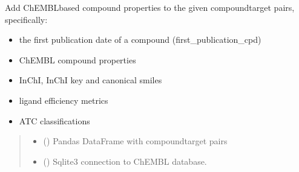 \documentclass[letterpaper,10pt,english]{sphinxmanual}
\begin{document}
\begin{fulllineitems}
\label{\detokenize{add_chembl_compound_properties:add_chembl_compound_properties.add_all_chembl_compound_properties}}
\pysigstartsignatures
{}
\pysigstopsignatures
\sphinxAtStartPar
Add ChEMBL\sphinxhyphen{}based compound properties to the given compound\sphinxhyphen{}target pairs, specifically:
\begin{itemize}
\item {} 
\sphinxAtStartPar
the first publication date of a compound (first\_publication\_cpd)

\item {} 
\sphinxAtStartPar
ChEMBL compound properties

\item {} 
\sphinxAtStartPar
InChI, InChI key and canonical smiles

\item {} 
\sphinxAtStartPar
ligand efficiency metrics

\item {} 
\sphinxAtStartPar
ATC classifications

\end{itemize}
\begin{quote}\begin{description}
\begin{itemize}
\item {} 
\sphinxAtStartPar
{} () \textendash{} Pandas DataFrame with compound\sphinxhyphen{}target pairs

\item {} 
\sphinxAtStartPar
{} () \textendash{} Sqlite3 connection to ChEMBL database.


\end{itemize}
\end{description}
\end{quote}
\end{fulllineitems}
\end{document}

